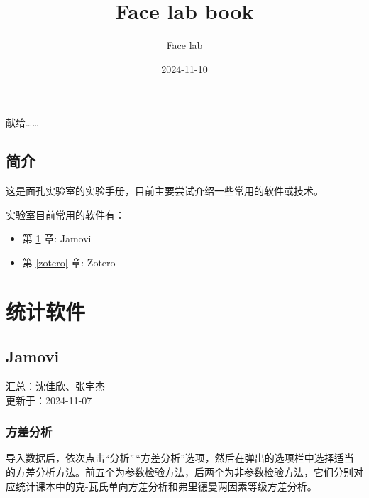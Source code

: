 \documentclass[]{ctexbook}
\title{Face lab book}
\author{Face lab}
\date{2024-11-10}
\providecommand{\tightlist}{%
  \setlength{\itemsep}{0pt}\setlength{\parskip}{0pt}}
\theoremstyle{definition}
\theoremstyle{definition}
\theoremstyle{definition}
\theoremstyle{definition}
\theoremstyle{remark}
\begin{document}
\maketitle


\thispagestyle{empty}

\begin{center}
献给……

\end{center}

\setlength{\abovedisplayskip}{-5pt}
\setlength{\abovedisplayshortskip}{-5pt}

{
\setcounter{tocdepth}{2}
\tableofcontents
}
\listoftables
\listoffigures
\chapter{简介}\label{ux7b80ux4ecb}

这是面孔实验室的实验手册，目前主要尝试介绍一些常用的软件或技术。

实验室目前常用的软件有：

\begin{itemize}
\tightlist
\item
  第 \ref{jamovi} 章: Jamovi\\
\item
  第 \ref{zotero} 章: Zotero
\end{itemize}

\mainmatter

\part{统计软件}\label{part-ux7edfux8ba1ux8f6fux4ef6}

\chapter{Jamovi}\label{jamovi}

汇总：沈佳欣、张宇杰\\
更新于：2024-11-07

\section{方差分析}\label{ux65b9ux5deeux5206ux6790}

导入数据后，依次点击``分析''\,``方差分析''选项，然后在弹出的选项栏中选择适当的方差分析方法。前五个为参数检验方法，后两个为非参数检验方法，它们分别对应统计课本中的克-瓦氏单向方差分析和弗里德曼两因素等级方差分析。
\end{document}
